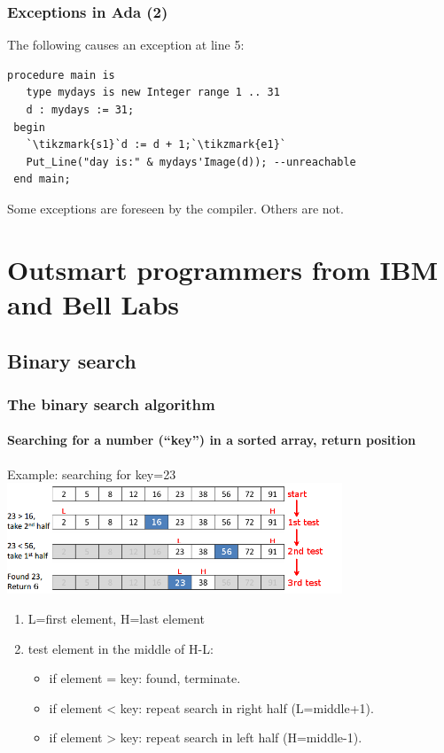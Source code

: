 \begin{frame}[fragile]\frametitle{Exceptions in Ada (2)}
The following causes an exception at line 5:
\begin{lstlisting}[escapechar=\`]
 procedure main is
   type mydays is new Integer range 1 .. 31
   d : mydays := 31;
 begin 
   `\tikzmark{s1}`d := d + 1;`\tikzmark{e1}`
   Put_Line("day is:" & mydays'Image(d)); --unreachable
 end main;
\end{lstlisting}

Some exceptions are foreseen by the compiler. Others are not.
\end{frame}
\addtocounter{clock}{1}

\section{Outsmart programmers from IBM and Bell Labs}
\subsection{Binary search}

\begin{frame}
  \frametitle{The binary search algorithm} 
  \framesubtitle{Searching for a number (``key'') in a sorted array, return position}
  
  Example: searching for key=23
  \hspace{3mm}\includegraphics[width=10cm]{content/images/spark/binary-search}
  \begin{enumerate}
  \item \alert L=first element, \alert H=last element
  \item \textcolor{Pantone301}{test element} in the middle of H-L:
    \begin{itemize}
    \item if element = key: found, terminate.
    \item if element < key: repeat search in right half (L=middle+1).
    \item if element > key: repeat search in left half (H=middle-1).
    \end{itemize}
  \end{enumerate}
\end{frame}
\addtocounter{clock}{3}

